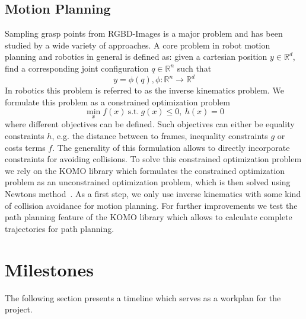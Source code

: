 \documentclass[a4paper]{article}
\begin{document}
\subsection{Motion Planning}
\label{3_2subsec_motion_planning}
Sampling grasp points from RGBD-Images is a major problem and has been studied by a wide variety of approaches.
A core problem in robot motion planning and robotics in general is defined as: given a cartesian position $y \in \mathbb{R}^d$, find a corresponding joint configuration $q \in \mathbb{R}^n$ such that
\begin{equation}
    y = \phi(q),  \phi : \mathbb{R}^n \rightarrow \mathbb{R}^d
\end{equation}
In robotics this problem is referred to as the inverse kinematics problem.
We formulate this problem as a constrained optimization problem 
\begin{equation}
    \min_x f(x) \ \text{s.t.} \ g(x) \leq 0, \  h(x) = 0
\end{equation}
where different objectives can be defined. 
Such objectives can either be equality constraints $h$, e.g. the distance between to frames, inequality constraints $g$ or costs terms $f$.
The generality of this formulation allows to directly incorporate constraints for avoiding collisions.
To solve this constrained optimization problem we rely on the KOMO library which formulates the constrained optimization problem as an unconstrained optimization problem, which is then solved using Newtons method~\cite{laumond_tutorial_2017}.
As a first step, we only use inverse kinematics with some kind of collision avoidance for motion planning. 
For further improvements we test the path planning feature of the KOMO library which allows to calculate complete trajectories for path planning.


\section{Milestones}
\label{4_sec_milestones}

The following section presents a timeline which serves as a workplan for the project.
\end{document}
